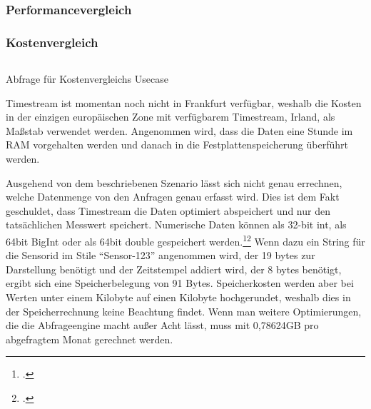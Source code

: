 \subsubsection{Performancevergleich}

\subsubsection{Kostenvergleich}
\begin{listing}[H]
\inputminted[frame=lines,breaklines=true]{sql}{code/timestream-threshold.sql}
\caption{Abfrage für Kostenvergleichs Usecase}
\label{listing:timestream-kostenvergleich}
\end{listing}

Timestream ist momentan noch nicht in Frankfurt verfügbar, weshalb die Kosten in der einzigen europäischen Zone mit verfügbarem Timestream, Irland, als Maßstab verwendet werden. Angenommen wird, dass die Daten eine Stunde im \ac{RAM} vorgehalten werden und danach in die Festplattenspeicherung überführt werden.


Ausgehend von dem beschriebenen Szenario lässt sich nicht genau errechnen, welche Datenmenge von den Anfragen genau erfasst wird. Dies ist dem Fakt geschuldet, dass Timestream die Daten optimiert abspeichert und nur den tatsächlichen Messwert speichert. Numerische Daten können als 32-bit int, als 64bit BigInt oder als 64bit double gespeichert werden.\footcite[Vgl. auch im Folgenden][]{AmazonWebServicesInc..o.J.r}\nzitat\footcite[Vgl. auch im Folgenden][]{AmazonWebServicesInc..o.J.q} Wenn dazu ein String für die Sensorid im Stile \enquote{Sensor-123} angenommen wird, der 19 bytes zur Darstellung benötigt und der Zeitstempel addiert wird, der 8 bytes benötigt, ergibt sich eine Speicherbelegung von 91 Bytes. Speicherkosten werden aber bei Werten unter einem Kilobyte auf einen Kilobyte hochgerundet, weshalb dies in der Speicherrechnung keine Beachtung findet. Wenn man weitere Optimierungen, die die Abfrageengine macht außer Acht lässt, muss mit 0,78624GB pro abgefragtem Monat gerechnet werden.

